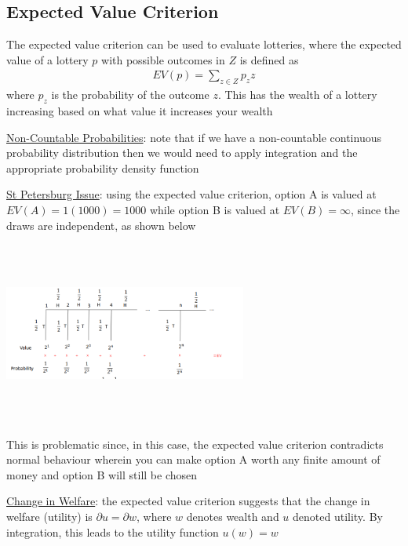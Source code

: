 \documentclass{article}
\begin{document}
\subsection{Expected Value Criterion}
The expected value criterion can be used to evaluate lotteries, where the expected value of a lottery $p$ with possible outcomes in $Z$ is defined as
\begin{gather*}
  EV(p) = \sum_{z \in Z} p_{z}z
\end{gather*}
where $p_{z}$ is the probability of the outcome $z$. This has the wealth of a lottery increasing based on what value it increases your wealth
\par \vspace{0.3em}
  \underline{Non-Countable Probabilities}: note that if we have a non-countable continuous probability distribution then we would need to apply integration and the appropriate probability density function
  \par
  \underline{St Petersburg Issue}: using the expected value criterion, option A is valued at $EV(A) = 1(1000) = 1000$ while option B is valued at $EV(B) = \infty$, since the draws are independent, as shown below
  \\
  \begin{center}
    \includegraphics[width=8cm, height=6cm]{pic27}
  \end{center}
  This is problematic since, in this case, the expected value criterion contradicts normal behaviour wherein you can make option A worth any finite amount of money and option B will still be chosen
  \par
  \underline{Change in Welfare}: the expected value criterion suggests that the change in welfare (utility) is $\partial u = \partial w$, where $w$ denotes wealth and $u$ denoted utility. By integration, this leads to the utility function $u(w) = w$
\vspace{6mm}
\end{document}
